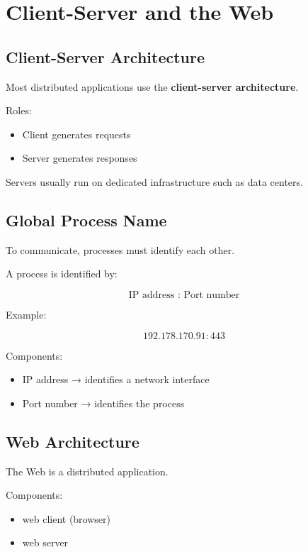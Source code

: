 
\section{Client-Server and the Web}

\subsection{Client-Server Architecture}

Most distributed applications use the \textbf{client-server architecture}.

Roles:

\begin{itemize}
\item Client generates requests
\item Server generates responses
\end{itemize}

Servers usually run on dedicated infrastructure such as data centers.

\subsection{Global Process Name}

To communicate, processes must identify each other.

A process is identified by:

\[
\text{IP address : Port number}
\]

Example:

\[
192.178.170.91 : 443
\]

Components:

\begin{itemize}
\item IP address → identifies a network interface
\item Port number → identifies the process
\end{itemize}

\subsection{Web Architecture}

The Web is a distributed application.

Components:

\begin{itemize}
\item web client (browser)
\item web server
\end{itemize}

